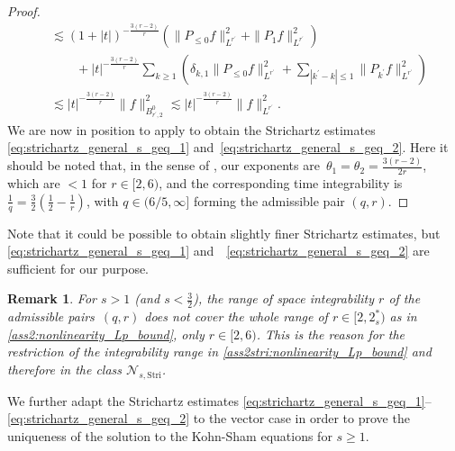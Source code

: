 \documentclass[12pt,a4paper]{amsart}
\newtheorem{remark}[theorem]{Remark}
\numberwithin{equation}{section}
\newcommand{\twoasts}{{2^*_s}}
\newcommand{\NStri}{\mathscr{N}_{s,\mathrm{Stri}}}
\begin{document}
\begin{proof}
\begin{align}
			& \lesssim (1+|t|)^{-\frac{3(r-2)}{r}} ( \| P_{\leq0} f \|_{L^{r^\prime}}^2 + \|  P_{1} f \|_{L^{r^\prime}}^2  ) \\
			& \qquad + |t|^{-\frac{3(r-2)}{r}}  \sum_{k \geq 1} ( \delta_{k,1} \| P_{\leq0} f \|_{L^{r^\prime}}^2 + \sum_{|k^\prime-k|\leq1} \|  P_{k^\prime} f \|_{L^{r^\prime}}^2  ) \\
			& \lesssim |t|^{-\frac{3(r-2)}{r}} \| f \|_{B^{0}_{r^\prime,2}}^2 \lesssim |t|^{-\frac{3(r-2)}{r}} \| f \|_{L^{r^\prime}}^2 .
		\end{align}
		We are now in position to apply \cite[Proposition 1]{GUO20081642} to obtain the Strichartz estimates \eqref{eq:strichartz_general_s_geq_1} and~\eqref{eq:strichartz_general_s_geq_2}. Here it should be noted that, in the sense of \cite[Definition 1a)]{GUO20081642}, our exponents are~$\theta_1=\theta_2= \frac{3(r-2)}{2r}$, which are $<1$ for $ r \in [2,6) $, and the corresponding time integrability is~$ \frac{1}{q} = \frac{3}{2}(\frac{1}{2}-\frac{1}{r})$, with $q \in (6/5,\infty] $ forming the admissible pair $ (q,r) $.
	\end{proof}
	
	Note that it could be possible to obtain slightly finer Strichartz estimates, but \eqref{eq:strichartz_general_s_geq_1} and~ \eqref{eq:strichartz_general_s_geq_2} are sufficient for our purpose. 
	\begin{remark} 
		For $s > 1$ (and $s<\frac32$), the range of space integrability $r$ of the admissible pairs~$(q,r)$ does not cover the whole range of $ r \in [2,\twoasts) $ as in \ref{ass2:nonlinearity_Lp_bound}, only $ r \in [2,6) $. This is the reason for the restriction of the integrability range in \ref{ass2stri:nonlinearity_Lp_bound} and therefore in the class $\NStri$.
	\end{remark}
	
	We further adapt the Strichartz estimates \eqref{eq:strichartz_general_s_geq_1}--\eqref{eq:strichartz_general_s_geq_2} to the vector case in order to prove the uniqueness of the solution to the Kohn-Sham equations for $ s \geq 1$. 
	
\end{document}
